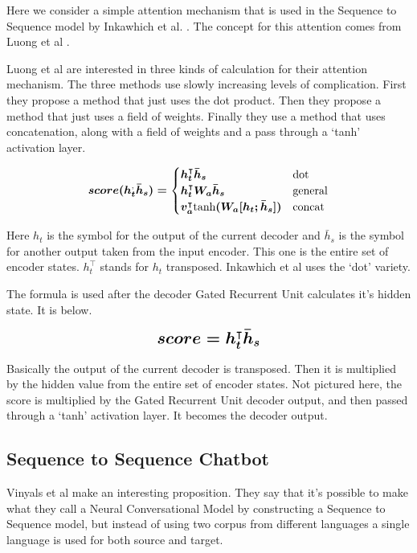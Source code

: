 Here we consider a simple attention mechanism that is used in the Sequence to Sequence model by Inkawhich et al. \cite{2018Inkawhich}. The concept for this attention comes from Luong et al \cite{DBLP:journals/corr/LuongPM15}.

Luong et al \cite{DBLP:journals/corr/LuongPM15} are interested in three kinds of calculation for their attention mechanism. The three methods use slowly increasing levels of complication. First they propose a method that just uses the dot product. Then they propose a method that just uses a field of weights. Finally they use a method that uses concatenation, along with a field of weights and a pass through a `tanh' activation layer.

$$
\boldmath
score(h_t^ \text{,} \bar{h}_s) =
\begin{cases}
    h_t^\intercal \bar{h}_s & \text{dot} \\
	h_t^\intercal W_a \bar{h}_s & \text{general} \\
	v_a^\intercal \text{tanh}(W_a [h_t ; \bar{h}_s] ) & \text{concat}
\end{cases}
\unboldmath
$$

Here $h_t$ is the symbol for the output of the current decoder and $\bar{h}_s $ is the symbol for another output taken from the input encoder. This one is the entire set of encoder states. $h_t^\intercal$ stands for $h_t$ transposed. Inkawhich et al \cite{2018Inkawhich} uses the `dot' variety.

The formula is used after the decoder Gated Recurrent Unit calculates it's hidden state. It is below.

$$ 
\boldmath
\mathlarger{ \mathlarger{
score = h_t^\intercal \bar{h}_s 
} }
\unboldmath
$$ 

Basically the output of the current decoder is transposed. Then it is multiplied by the hidden value from the entire set of encoder states. Not pictured here, the score is multiplied by the Gated Recurrent Unit decoder output, and then passed through a `tanh' activation layer. It becomes the decoder output.

\subsection{Sequence to Sequence Chatbot}

Vinyals et al \cite{DBLP:journals/corr/VinyalsL15} make an interesting proposition. They say that it's possible to make what they call a Neural Conversational Model by constructing a Sequence to Sequence model, but instead of using two corpus from different languages a single language is used for both source and target.

